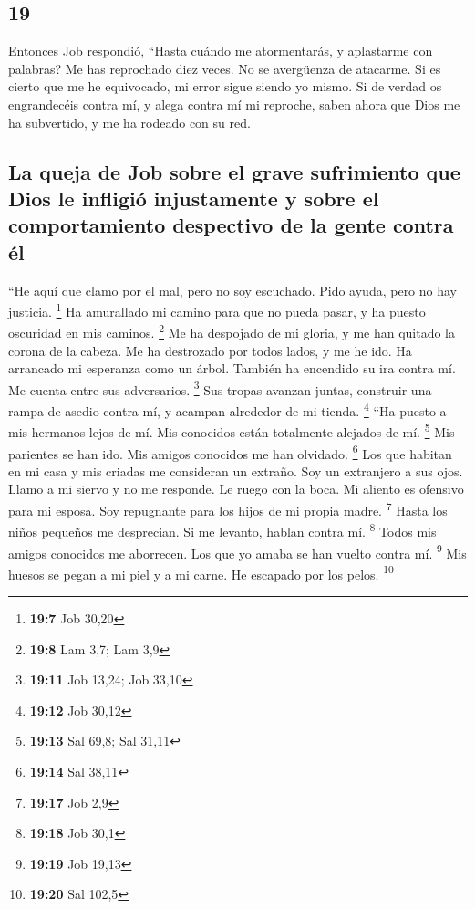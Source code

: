 \begin{paracol}{2}
\hypertarget{section-36}{%
\section{19}\label{section-36}}

 Entonces Job respondió,  ``Hasta cuándo me
atormentarás, y aplastarme con palabras?  Me has
reprochado diez veces. No se avergüenza de atacarme.  Si
es cierto que me he equivocado, mi error sigue siendo yo mismo.
 Si de verdad os engrandecéis contra mí, y alega contra mí
mi reproche,  saben ahora que Dios me ha subvertido, y me
ha rodeado con su red.

\hypertarget{la-queja-de-job-sobre-el-grave-sufrimiento-que-dios-le-infligiuxf3-injustamente-y-sobre-el-comportamiento-despectivo-de-la-gente-contra-uxe9l}{%
\subsection{La queja de Job sobre el grave sufrimiento que Dios le
infligió injustamente y sobre el comportamiento despectivo de la gente
contra
él}\label{la-queja-de-job-sobre-el-grave-sufrimiento-que-dios-le-infligiuxf3-injustamente-y-sobre-el-comportamiento-despectivo-de-la-gente-contra-uxe9l}}

 ``He aquí que clamo por el mal, pero no soy escuchado.
Pido ayuda, pero no hay justicia. \footnote{\textbf{19:7} Job 30,20}
 Ha amurallado mi camino para que no pueda pasar, y ha
puesto oscuridad en mis caminos. \footnote{\textbf{19:8} Lam 3,7; Lam
  3,9}  Me ha despojado de mi gloria, y me han quitado la
corona de la cabeza.  Me ha destrozado por todos lados, y
me he ido. Ha arrancado mi esperanza como un árbol. 
También ha encendido su ira contra mí. Me cuenta entre sus adversarios.
\footnote{\textbf{19:11} Job 13,24; Job 33,10}  Sus
tropas avanzan juntas, construir una rampa de asedio contra mí, y
acampan alrededor de mi tienda. \footnote{\textbf{19:12} Job 30,12}
 ``Ha puesto a mis hermanos lejos de mí. Mis conocidos
están totalmente alejados de mí. \footnote{\textbf{19:13} Sal 69,8; Sal
  31,11}  Mis parientes se han ido. Mis amigos conocidos
me han olvidado. \footnote{\textbf{19:14} Sal 38,11}  Los
que habitan en mi casa y mis criadas me consideran un extraño. Soy un
extranjero a sus ojos.  Llamo a mi siervo y no me
responde. Le ruego con la boca.  Mi aliento es ofensivo
para mi esposa. Soy repugnante para los hijos de mi propia madre.
\footnote{\textbf{19:17} Job 2,9}  Hasta los niños
pequeños me desprecian. Si me levanto, hablan contra mí. \footnote{\textbf{19:18}
  Job 30,1}  Todos mis amigos conocidos me aborrecen. Los
que yo amaba se han vuelto contra mí. \footnote{\textbf{19:19} Job 19,13}
 Mis huesos se pegan a mi piel y a mi carne. He escapado
por los pelos. \footnote{\textbf{19:20} Sal 102,5}


\end{paracol}
